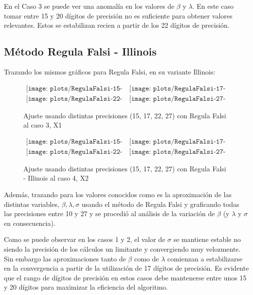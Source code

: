 En el Caso 3 se puede ver una anomal\'ia en los valores de $\beta$ y $\lambda$. 
En este caso tomar entre 15 y 20 d\'igitos de precisi\'on no es suficiente para 
obtener valores relevantes. Estos se estabilizan recien a partir de los 22 
d\'igitos de precisi\'on.

\subsection{M\'etodo Regula Falsi - Illinois}

Trazando los mismos gr\'aficos para Regula Falsi, en su variante Illinois:

\begin{figure} [H]
$\begin{array}{cc}
\texttt{[image: plots/RegulaFalsi-15-caso3.png]} &
\texttt{[image: plots/RegulaFalsi-17-caso3.png]} \\
\texttt{[image: plots/RegulaFalsi-22-caso3.png]} &
\texttt{[image: plots/RegulaFalsi-27-caso3.png]}
\end{array}$
\caption{Ajuste usando distintas precisiones (15, 17, 22, 27) con 
Regula Falsi al caso 3, X1}
\label{fig:FitCaso3RegulaFalsi}
\end{figure}

\begin{figure} [H]
$\begin{array}{cc}
\texttt{[image: plots/RegulaFalsi-15-caso4.png]} &
\texttt{[image: plots/RegulaFalsi-17-caso4.png]} \\
\texttt{[image: plots/RegulaFalsi-22-caso4.png]} &
\texttt{[image: plots/RegulaFalsi-27-caso4.png]}
\end{array}$
\caption{Ajuste usando distintas precisiones (15, 17, 22, 27) con Regula 
Falsi - Illinois al caso 4, X2}
\label{fig:FitCaso4RegulaFalsi}
\end{figure}


Adem\'as, trazando para los valores conocidos como es la aproximaci\'on de las 
distintas variables, $\beta, \lambda, \sigma$ usando el m\'etodo de Regula Falsi
y graficando todas las precisiones entre 10 y 27 y se procedi\'o al an\'alisis de
la variaci\'on de $\beta$ (y $\lambda$ y $\sigma$ en consecuencia).

Como se puede observar en los casos 1 y 2, el valor de $\sigma$ se mantiene 
estable no siendo la precisi\'on de los c\'alculos un limitante y convergiendo 
muy velozmente. Sin embargo las aproximaciones tanto de $\beta$ como de $\lambda$ 
comienzan a estabilizarse en la convergencia a partir de la utilizaci\'on de 17 
d\'igitos de precisi\'on. Es evidente que el rango de d\'igitos de precisi\'on en 
estos casos debe mantenerse entre unos 15 y 20 d\'igitos para maximizar la 
eficiencia del algoritmo.  


